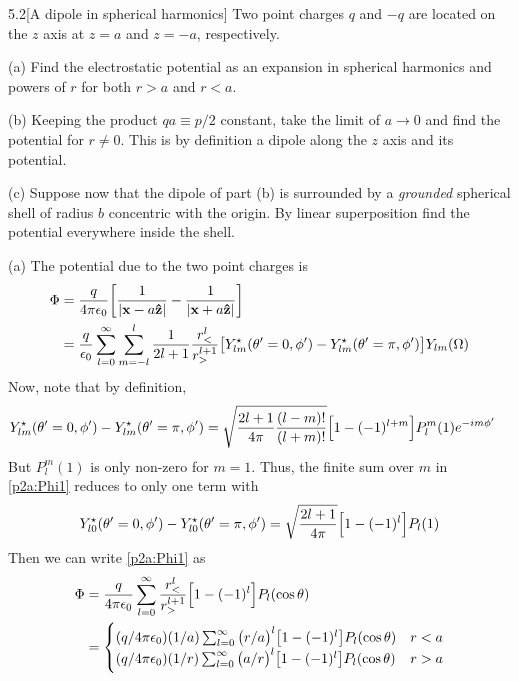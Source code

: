 \documentclass[12pt]{article}
\begin{document}
\begin{problem}{5.2}[A dipole in spherical harmonics]
Two point charges $q$ and $-q$ are located on the $z$ axis at $z=a$ and $z=-a$,
respectively.

(a) Find the electrostatic potential as an expansion in spherical harmonics and
powers of $r$ for both $r>a$ and $r<a$.

(b) Keeping the product $qa\equiv p /2$ constant, take the limit of $a\to 0$ and
find the potential for $r\neq 0$. This is by definition a dipole along the $z$
axis and its potential.

(c) Suppose now that the dipole of part (b) is surrounded by a \textit{grounded}
spherical shell of radius $b$ concentric with the origin. By linear
superposition find the potential everywhere inside the shell.
\begin{solution}
(a) The potential due to the two point charges is
\begin{align}\label{p2a:Phi1}
    \Phi&=\frac{q}{4\pi\epsilon_0}\qty[\frac1{\abs{\vb{x}-a\vb{\hat{z}}}}-\frac1{\abs{\vb{x}+a\vb{\hat{z}}}}]\notag\\
    &=\frac{q}{\epsilon_0}\sum_{l=0}^\infty\sum_{m=-l}^l
    \frac1{2l+1}\frac{r_<^l}{r_>^{l+1}}\qty[
    Y_{lm}^\star(\theta'=0,\phi')-Y_{lm}^\star(\theta'=\pi,\phi')
    ]Y_{lm}(\Omega)
\end{align}
Now, note that by definition,
\begin{align}
    Y_{lm}^\star(\theta'=0,\phi')-Y_{lm}^\star(\theta'=\pi,\phi')
    &=\sqrt{\frac{2l+1}{4\pi}\frac{(l-m)!}{(l+m)!}}\qty[1-(-1)^{l+m}]P_l^m(1)e^{-im\phi'}
\end{align}
But $P_l^m(1)$ is only non-zero for $m=1$. Thus, the finite sum over $m$ in
\eqref{p2a:Phi1} reduces to only one term with
\begin{equation}
    Y_{l0}^\star(\theta'=0,\phi')-Y_{l0}^\star(\theta'=\pi,\phi') 
    =\sqrt{\frac{2l+1}{4\pi}}\qty[1-(-1)^l]P_l(1)
\end{equation}
Then we can write \eqref{p2a:Phi1} as
\begin{align}\label{p2a:Phi2}
    \Phi&=\frac{q}{4\pi\epsilon_0}\sum_{l=0}^\infty
        \frac{r_<^l}{r_>^{l+1}}\qty[1-(-1)^l]P_l(\cos\theta)\notag\\
    &=\begin{cases}
    (q/4\pi\epsilon_0)(1/a)\sum_{l=0}^\infty\qty(r/a)^l
    \qty[1-(-1)^l]P_l(\cos\theta) & r<a\\
    (q/4\pi\epsilon_0)(1/r)\sum_{l=0}^\infty\qty(a/r)^l
    \qty[1-(-1)^l]P_l(\cos\theta) & r>a
    \end{cases}

\end{align}
\end{solution}
\end{problem}
\end{document}
